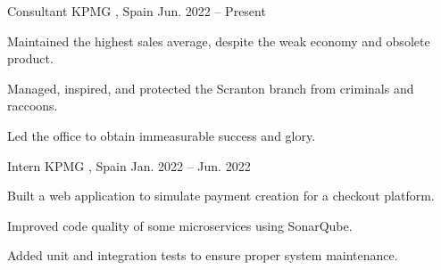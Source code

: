 

\begin{cventries}

  \cventry
    {Consultant} %
    {KPMG} %
    {\comMadrid, Spain} %
    {Jun. 2022 -- Present} %
    {
      \begin{cvitems} %
        \item {Maintained the highest sales average, despite the weak economy and obsolete product.}
        \item {Managed, inspired, and protected the Scranton branch from criminals and raccoons.}
        \item {Led the office to obtain immeasurable success and glory.}
      \end{cvitems}
    }

  \cventry
    {Intern} %
    {KPMG} %
    {\comMadrid, Spain} %
    {Jan. 2022 -- Jun. 2022} %
    {
      \begin{cvitems} %
        \item {Built a web application to simulate payment creation for a checkout platform.}
        \item {Improved code quality of some microservices using SonarQube.}
        \item {Added unit and integration tests to ensure proper system maintenance.}
      \end{cvitems}
    }

\end{cventries}

